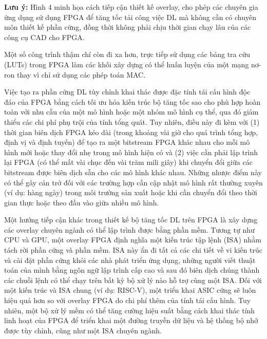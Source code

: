 \documentclass[a4paper]{article}
\begin{document}
    \textbf{Lưu ý:} Hình 4 minh họa cách tiếp cận thiết kế overlay, cho phép các chuyên gia ứng dụng sử dụng FPGA để tăng tốc tải công việc DL mà không cần có chuyên môn thiết kế phần cứng, đồng thời không phải chịu thời gian chạy lâu của các công cụ CAD cho FPGA.
    
    Một số công trình thậm chí còn đi xa hơn, trực tiếp sử dụng các bảng tra cứu (LUTs) trong FPGA làm các khối xây dựng có thể huấn luyện của một mạng nơ-ron thay vì chỉ sử dụng các phép toán MAC.
    
    Việc tạo ra phần cứng DL tùy chỉnh khai thác được đặc tính tái cấu hình độc đáo của FPGA bằng cách tối ưu hóa kiến trúc bộ tăng tốc sao cho phù hợp hoàn toàn với nhu cầu của một mô hình hoặc một nhóm mô hình cụ thể, qua đó giảm thiểu các chi phí phụ trội của tính tổng quát. Tuy nhiên, điều này đi kèm với (1) thời gian biên dịch FPGA kéo dài (trong khoảng vài giờ cho quá trình tổng hợp, định vị và định tuyến) để tạo ra một bitstream FPGA khác nhau cho mỗi mô hình mới hoặc thay đổi nhẹ trong mô hình hiện có và (2) việc cần phải lập trình lại FPGA (có thể mất vài chục đến vài trăm mili giây) khi chuyển đổi giữa các bitstream được biên dịch sẵn cho các mô hình khác nhau. Những nhược điểm này có thể gây cản trở đối với các trường hợp cần cập nhật mô hình rất thường xuyên (ví dụ: hàng ngày) trong môi trường sản xuất hoặc khi cần chuyển đổi theo thời gian thực hoặc theo đầu vào giữa nhiều mô hình.
    
    Một hướng tiếp cận khác trong thiết kế bộ tăng tốc DL trên FPGA là xây dựng các overlay chuyên ngành có thể lập trình được bằng phần mềm. Tương tự như CPU và GPU, một overlay FPGA định nghĩa một kiến trúc tập lệnh (ISA) nhằm tách rời phần cứng và phần mềm. ISA này ẩn đi tất cả các chi tiết về vi kiến trúc và cài đặt phần cứng khỏi các nhà phát triển ứng dụng, những người viết thuật toán của mình bằng ngôn ngữ lập trình cấp cao và sau đó biên dịch chúng thành các chuỗi lệnh có thể chạy trên bất kỳ bộ xử lý nào hỗ trợ cùng một ISA. Đối với một kiến trúc và ISA chung (ví dụ: RISC-V), một triển khai ASIC cứng sẽ luôn hiệu quả hơn so với overlay FPGA do chi phí thêm của tính tái cấu hình. Tuy nhiên, một bộ xử lý mềm có thể tăng cường hiệu suất bằng cách khai thác tính linh hoạt của FPGA để triển khai một đường truyền dữ liệu và hệ thống bộ nhớ được tùy chỉnh, cũng như một ISA chuyên ngành.
    
\end{document}
